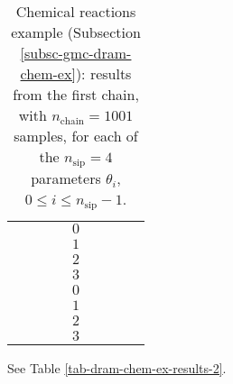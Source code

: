 \begin{table}[h!]
\begin{center}
\begin{tabular}{|c|c|c|c|c|c|c|c|c|}
\hline
\hline
       &          &                        &                        & $0$ &                          &                                &                        &                               \\
\cline{5-9}
       &          &                        &                        & $1$ &                          &                                &                        &                               \\
\cline{5-9}
       &          &                        &                        & $2$ &                          &                                &                        &                               \\
\cline{5-9}
       &          &                        &                        & $3$ &                          &                                &                        &                               \\
\hline
\hline
       &          &                        &                        & $0$ &                          &                                &                        &                               \\
\cline{5-9}
       &          &                        &                        & $1$ &                          &                                &                        &                               \\
\cline{5-9}
       &          &                        &                        & $2$ &                          &                                &                        &                               \\
\cline{5-9}
       &          &                        &                        & $3$ &                          &                                &                        &                               \\
\hline
\end{tabular}
\caption{Chemical reactions example (Subsection \ref{subsc-gmc-dram-chem-ex}):
results from the first chain, with $n_{\text{chain}}=1001$ samples,
for each of the $n_{\text{sip}}=4$ parameters $\theta_i$, $0\leqslant i\leqslant n_{\text{sip}}-1$.
}
\label{tab-dram-chem-ex-results-1}
\end{center}
\end{table}

See Table \ref{tab-dram-chem-ex-results-2}.

